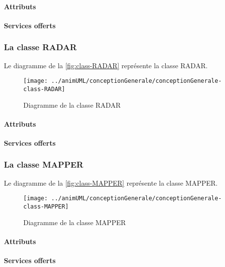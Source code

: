 \paragraph{Attributs}
\classEXPLORERProperties
\paragraph{Services offerts}
\classEXPLOREROperations
\subsubsection{La classe RADAR}

Le diagramme de la \autoref{fig:class-RADAR} représente la classe RADAR.
\begin{figure}[H]
	\centering
	\texttt{[image: ../animUML/conceptionGenerale/conceptionGenerale-class-RADAR]}
	\caption{Diagramme de la classe RADAR}
	\label{fig:class-RADAR}
\end{figure}


\paragraph{Attributs}
\classRADARProperties
\paragraph{Services offerts}
\classRADAROperations
\subsubsection{La classe MAPPER}

Le diagramme de la \autoref{fig:class-MAPPER} représente la classe MAPPER.
\begin{figure}[H]
	\centering
	\texttt{[image: ../animUML/conceptionGenerale/conceptionGenerale-class-MAPPER]}
	\caption{Diagramme de la classe MAPPER}
	\label{fig:class-MAPPER}
\end{figure}


\paragraph{Attributs}
\classMAPPERProperties
\paragraph{Services offerts}
\classMAPPEROperations
